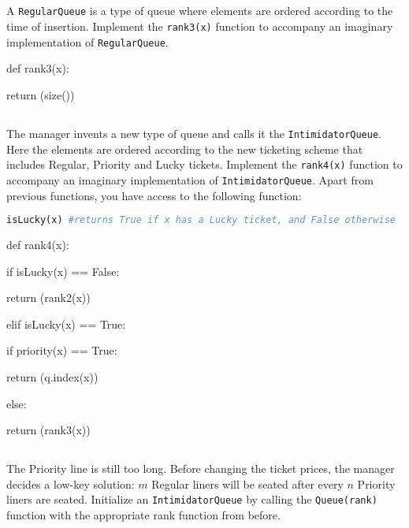 \documentclass[addpoints]{exam}
\begin{document}
	\subsection{} A \texttt{RegularQueue} is a type of queue where elements are ordered according to the time of insertion. Implement the \texttt{rank3(x)} function to accompany an imaginary implementation of \texttt{RegularQueue}.
	
	\begin{mdframed}
		def rank3(x):
	
    return (size())
	\end{mdframed}
	
	\subsection{}The manager invents a new type of queue and calls it the \texttt{IntimidatorQueue}. Here the elements are ordered according to the new ticketing scheme that includes Regular, Priority and Lucky tickets. Implement the \texttt{rank4(x)} function to accompany an imaginary implementation of \texttt{IntimidatorQueue}. Apart from previous functions, you have access to the following function:
	\begin{lstlisting}[language=Python]
	isLucky(x) #returns True if x has a Lucky ticket, and False otherwise\end{lstlisting}
	
	\begin{mdframed}
		def rank4(x):
    
    if isLucky(x) == False:
    
    \hspace*{20pt}return (rank2(x))
        
    elif isLucky(x) == True:
    
    \hspace*{20pt}if priority(x) == True:
        
        \hspace*{40pt}return (q.index(x))
            
    \hspace*{20pt}else:
        
        \hspace*{40pt}return (rank3(x))
	\end{mdframed}
	
	\subsection{} The Priority line is still too long. Before changing the ticket prices, the manager decides a low-key solution: $m$ Regular liners will be seated after every $n$ Priority liners are seated. Initialize an \texttt{IntimidatorQueue} by calling the \texttt{Queue(rank)} function with the appropriate rank function from before. 
	
\end{document}
